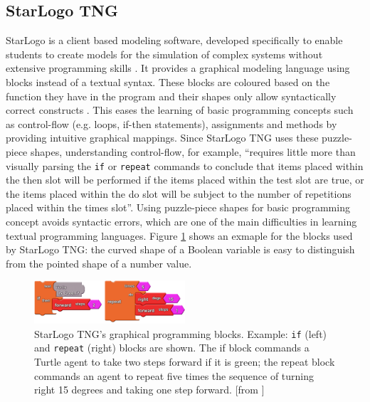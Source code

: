 \documentclass[runningheads,a4paper]{llncs}
\begin{document}
 \subsection{StarLogo TNG}
  StarLogo is a client based modeling software, developed specifically to enable students to 
  create models for the simulation of complex systems without extensive programming skills \cite{klopfer2009starlogo}.
  It provides a graphical modeling language using blocks instead of a textual syntax. 
  These blocks are coloured based on the function they have in the program and their shapes only allow syntactically correct constructs \cite{klopfer2009starlogo}.
  This eases the learning of basic programming concepts such as control-flow (e.g. loops, if-then statements),
  assignments and methods by providing intuitive graphical mappings. Since StarLogo TNG uses these puzzle-piece shapes, understanding 
  control-flow, for example, ``requires little more than visually parsing the \texttt{if} or \texttt{repeat} commands 
  to conclude that items placed within the then slot will be performed if the items placed within the 
  test slot are true, or the items placed within the do slot will be subject to the number of repetitions placed within the times slot''\cite{smith2011biology}.
  Using puzzle-piece shapes for basic programming concept avoids syntactic errors, 
  which are one of the main difficulties in learning textual programming languages.
  Figure \ref{fig1} shows an exmaple for the blocks used by StarLogo TNG: 
  the curved shape of a Boolean variable is easy to distinguish from the pointed shape of a number value.
  
  \begin{figure}[H]
	\centering
  \includegraphics[width=0.5\textwidth]{images/StarLogoTNGBlocksEx.PNG}
	\caption{ StarLogo TNG’s graphical programming blocks. Example: \texttt{if} (left) and \texttt{repeat} (right) blocks are shown. The
	  if block commands a Turtle agent to take two steps forward if it is green; the repeat block commands an agent to
	  repeat five times the sequence of turning right 15 degrees and taking one step forward. [from \cite{smith2011biology}]}
	\label{fig1}
  \end{figure}
  
\end{document}
